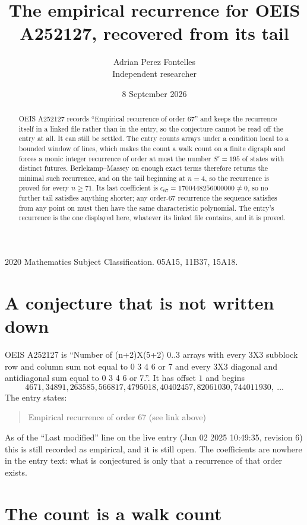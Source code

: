\documentclass[11pt,a4paper]{article}
\title{The empirical recurrence for OEIS A252127, recovered from its tail}
\author{Adrian Perez Fontelles\\ \small Independent researcher}
\date{8 September 2026}
\theoremstyle{plain}
\theoremstyle{definition}
\begin{document}
\maketitle

\begin{abstract}
OEIS A252127 records ``Empirical recurrence of order $67$'' and keeps the recurrence itself in
a linked file rather than in the entry, so the conjecture cannot be read off the entry at all.
It can still be settled. The entry counts arrays under a condition local to a bounded window of
lines, which makes the count a walk count on a finite digraph and forces a monic integer
recurrence of order at most the number $S'=195$ of states with distinct futures. Berlekamp--Massey on
enough exact terms therefore returns the minimal such recurrence, and on the tail beginning at $n=4$, so the recurrence is proved for every $n\ge71$.
Its last coefficient is $c_{67}=1700448256000000\neq0$, so no further tail satisfies anything
shorter; any order-$67$ recurrence the sequence satisfies from any point on must then have
the same characteristic polynomial. The entry's recurrence is the one displayed here, whatever
its linked file contains, and it is proved.
\end{abstract}

\noindent\small 2020 Mathematics Subject Classification. 05A15, 11B37, 15A18.\normalsize

\section{A conjecture that is not written down}

OEIS A252127 is ``Number of (n+2)X(5+2) 0..3 arrays with every 3X3 subblock row and column sum not equal to 0 3 4 6 or 7 and every 3X3 diagonal and antidiagonal sum equal to 0 3 4 6 or 7.''. It has offset $1$ and begins
\[
4671, 34891, 263585, 566817, 4795018, 40402457, 82061030, 744011930,\ \dots
\]
The entry states:
\begin{quote}
Empirical recurrence of order 67 (see link above)
\end{quote}
As of the ``Last modified'' line on the live entry (Jun 02 2025 10:49:35, revision 6)
this is still recorded as empirical, and it is still open. The coefficients are nowhere in the
entry text: what is conjectured is only that a recurrence of that order exists.

\section{The count is a walk count}
\end{document}
